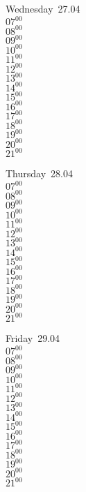 \documentclass[11pt,a4paper]{book}\usepackage[]{graphicx}\usepackage[]{color}
\begin{document}
\begin{weekdaybox}
  Wednesday~27.04\\
  { 
  \vfill
  $07^{00}$\\
$08^{00}$\\
$09^{00}$\\
$10^{00}$\\
$11^{00}$\\
$12^{00}$\\
$13^{00}$\\
$14^{00}$\\
$15^{00}$\\
$16^{00}$\\
$17^{00}$\\
$18^{00}$\\
$19^{00}$\\
$20^{00}$\\
$21^{00}$\\
  }
\end{weekdaybox}
\clearpage
\begin{headerbox}
\end{headerbox}
\begin{weekdaybox}
  Thursday~28.04\\
  { 
  \vfill
  $07^{00}$\\
$08^{00}$\\
$09^{00}$\\
$10^{00}$\\
$11^{00}$\\
$12^{00}$\\
$13^{00}$\\
$14^{00}$\\
$15^{00}$\\
$16^{00}$\\
$17^{00}$\\
$18^{00}$\\
$19^{00}$\\
$20^{00}$\\
$21^{00}$\\
  }
\end{weekdaybox} 
\begin{weekdaybox}
  Friday~29.04\\
  { 
  \vfill
  $07^{00}$\\
$08^{00}$\\
$09^{00}$\\
$10^{00}$\\
$11^{00}$\\
$12^{00}$\\
$13^{00}$\\
$14^{00}$\\
$15^{00}$\\
$16^{00}$\\
$17^{00}$\\
$18^{00}$\\
$19^{00}$\\
$20^{00}$\\
$21^{00}$\\
  }
\end{weekdaybox}
\end{document}
